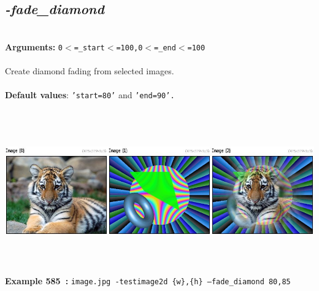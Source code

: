 \documentclass[a4paper,11pt,twoside]{book}
\begin{document}
\subsection{\emph{-fade\_diamond} }\vspace*{-0.5em}
~\\\textbf{Arguments: } 
{\small \texttt{0$<$=\_start$<$=100,0$<$=\_end$<$=100}}\\~\\
Create diamond fading from selected images.
~\\~\\\textbf{Default values}: {\small \texttt{'start=80'} and \texttt{'end=90'.}}
\begin{center}\includegraphics[keepaspectratio=true,height=7cm,width=\textwidth]{img/gmic_def585.jpg}\\
{\footnotesize \textbf{Example 585~:} \texttt{image.jpg -testimage2d \{w\},\{h\} --fade\_diamond 80,85}}
\end{center}
\end{document}
